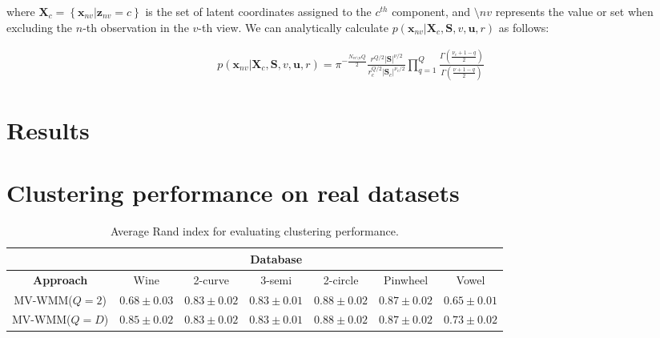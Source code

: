 \documentclass[]{article}
\newcommand{\Scluster}{\mathbf{S}}
\newcommand{\setX}{\mathbf{X}}
\newcommand{\obspv}{\mathbf{x}_{nv}}
\begin{document}
where $\setX_c = \left\{\obspv|\mathbf{z}_{nv}=c\right\}$ is the set of latent coordinates
assigned to the $c^{th}$ component, and $\setminus{nv}$ represents
the value or set when excluding the $n$-th observation in the $v$-th view. We can analytically calculate $p\left(\obspv|\setX_c, \Scluster,v,\mathbf{u},r\right)$  as follows:

\begin{align*}
p\left(\obspv|\setX_c, \Scluster,v,\mathbf{u},r\right) = \pi^{-\frac{N_{vc\setminus n}Q}{2}}\frac{r^{Q/2}|\Scluster|^{\nu/2}}{r_c^{Q/2}|\Scluster_c|^{\nu_c/2}}\prod_{q=1}^{Q}\frac{\Gamma\left(\frac{\nu_c + 1 -q}{2}\right)}{\Gamma\left(\frac{\nu + 1 -q}{2}\right)}
\end{align*}


\section{Results}

\section{Clustering performance on real datasets}

\begin{table}[ht!]
	\centering
	\caption{Average Rand index for evaluating clustering performance.}
	\label{tab:comparison1}
	\begin{tabular}{c c c c c c c}
		\cline{2-7}
		& \multicolumn{5}{c}{\textbf{Database}}\\
		\hline
		\textbf{Approach} &  	Wine & 2-curve & 3-semi & 2-circle & Pinwheel& Vowel\\
		\hline\hline
		\hline
		MV-WMM($Q=2$) & $0.68\pm0.03$  &$0.83\pm0.02$ &$0.83\pm0.01$&$0.88\pm0.02$&$0.87\pm0.02$ & $0.65\pm0.01$\\
		MV-WMM($Q=D$) & $0.85\pm 0.02$ &$0.83\pm0.02$&$0.83\pm0.01$&$0.88\pm0.02$&$0.87\pm0.02$&$0.73\pm0.02$\\
		\hline

	\end{tabular}
\end{table}
\end{document}
